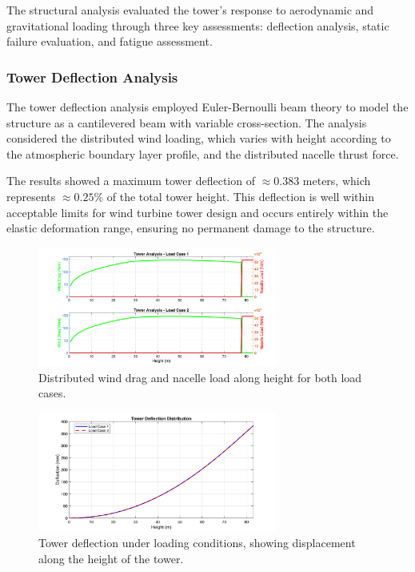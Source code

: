 \documentclass[11pt]{article}
\begin{document}
The structural analysis evaluated the tower's response to aerodynamic and gravitational loading through three key assessments: deflection analysis, static failure evaluation, and fatigue assessment.

\subsubsection{Tower Deflection Analysis}

The tower deflection analysis employed Euler-Bernoulli beam theory to model the structure as a cantilevered beam with variable cross-section. The analysis considered the distributed wind loading, which varies with height according to the atmospheric boundary layer profile, and the distributed nacelle thrust force.

The results showed a maximum tower deflection of $\approx 0.383$ meters, which represents $\approx 0.25\%$ of the total tower height. This deflection is well within acceptable limits for wind turbine tower design and occurs entirely within the elastic deformation range, ensuring no permanent damage to the structure.
\begin{figure}[H]
  \centering
  \includegraphics[width=0.7\textwidth]{../../PNGS/Tower_Load_Distribution.png}
  \caption{Distributed wind drag and nacelle load along height for both load cases.}
  \label{fig:tower_load_distribution}
\end{figure}
\begin{figure}[H]
  \centering
  \includegraphics[width=0.7\textwidth]{../../PNGS/Tower_Deflection_Only.png}
  \caption{Tower deflection under loading conditions, showing displacement along the height of the tower.}
  \label{fig:tower_deflection}
\end{figure}
\end{document}
